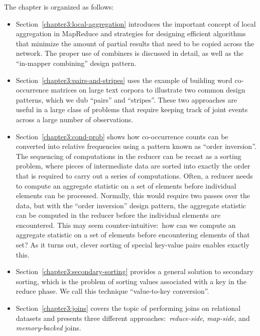 The chapter is organized as follows:

\begin{itemize}

\item Section~\ref{chapter3:local-aggregation} introduces the
  important concept of local aggregation in MapReduce and strategies
  for designing efficient algorithms that minimize the amount of
  partial results that need to be copied across the network.  The
  proper use of combiners is discussed in detail, as well as the
  ``in-mapper combining'' design pattern.

\item Section~\ref{chapter3:pairs-and-stripes} uses the example of
  building word co-occurrence matrices on large text corpora to
  illustrate two common design patterns, which we dub ``pairs'' and
  ``stripes''.  These two approaches are useful in a large class of
  problems that require keeping track of joint events across a large
  number of observations.

\item Section~\ref{chapter3:cond-prob} shows how co-occurrence counts
  can be converted into relative frequencies using a pattern known as
  ``order inversion''.  The sequencing of computations in the reducer
  can be recast as a sorting problem, where pieces of intermediate
  data are sorted into exactly the order that is required to carry out
  a series of computations.  Often, a reducer needs to compute an
  aggregate statistic on a set of elements before individual elements
  can be processed.  Normally, this would require two passes over the
  data, but with the ``order inversion'' design pattern, the aggregate
  statistic can be computed in the reducer before the individual
  elements are encountered.  This may seem counter-intuitive:\ how can
  we compute an aggregate statistic on a set of elements before
  encountering elements of that set?  As it turns out, clever sorting
  of special key-value pairs enables exactly this.

\item Section~\ref{chapter3:secondary-sorting} provides a general
  solution to secondary sorting, which is the problem of sorting
  values associated with a key in the reduce phase.  We call this
  technique ``value-to-key conversion''.

\item Section~\ref{chapter3:joins} covers the topic of performing
  joins on relational datasets and presents three different
  approaches:\ \emph{reduce-side}, \emph{map-side}, and \emph{
    memory-backed} joins.

\end{itemize}

